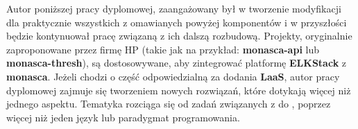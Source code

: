Autor poniższej pracy dyplomowej, zaangażowany był w tworzenie modyfikacji dla praktycznie wszystkich z omawianych powyżej komponentów i w przyszłości będzie kontynuował pracę związaną z ich dalszą rozbudową.
Projekty, oryginalnie zaproponowane przez firmę HP (takie jak na przykład: \textbf{monasca-api} lub \textbf{monasca-thresh}),
są dostosowywane, aby zintegrować platformę \textbf{ELKStack} z \textbf{monasca}.
Jeżeli chodzi o część odpowiedzialną za dodania \textbf{LaaS}, autor pracy dyplomowej zajmuje się
tworzeniem nowych rozwiązań, które dotykają więcej niż jednego aspektu. Tematyka rozciąga się
od zadań związanych z  
do , poprzez więcej niż jeden język lub paradygmat programowania.

